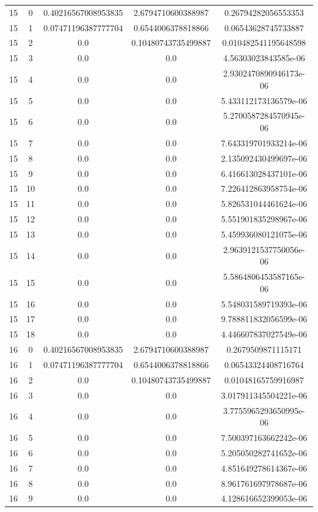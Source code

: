 \documentclass{article}
\begin{document}
\begin{table}[h]
\begin{tabular}{|c|c|c|c|c|}
15 & 0 & 0.40216567008953835 & 2.6794710600388987 & 0.26794282056553353 \\
15 & 1 & 0.07471196387777704 & 0.6544006378818866 & 0.06543628745733887 \\
15 & 2 & 0.0 & 0.10480743735499887 & 0.010482541195648598 \\
15 & 3 & 0.0 & 0.0 & 4.56303023843585e-06 \\
15 & 4 & 0.0 & 0.0 & 2.9302470890946173e-06 \\
15 & 5 & 0.0 & 0.0 & 5.433112173136579e-06 \\
15 & 6 & 0.0 & 0.0 & 5.2700587284570945e-06 \\
15 & 7 & 0.0 & 0.0 & 7.643319701933214e-06 \\
15 & 8 & 0.0 & 0.0 & 2.135092430499697e-06 \\
15 & 9 & 0.0 & 0.0 & 6.416613028437101e-06 \\
15 & 10 & 0.0 & 0.0 & 7.226412863958754e-06 \\
15 & 11 & 0.0 & 0.0 & 5.826531044461624e-06 \\
15 & 12 & 0.0 & 0.0 & 5.551901835298967e-06 \\
15 & 13 & 0.0 & 0.0 & 5.459936080121075e-06 \\
15 & 14 & 0.0 & 0.0 & 2.9639121537750056e-06 \\
15 & 15 & 0.0 & 0.0 & 5.5864806453587165e-06 \\
15 & 16 & 0.0 & 0.0 & 5.548031589719393e-06 \\
15 & 17 & 0.0 & 0.0 & 9.788811832056599e-06 \\
15 & 18 & 0.0 & 0.0 & 4.446607837027549e-06 \\
16 & 0 & 0.40216567008953835 & 2.6794710600388987 & 0.2679509871115171 \\
16 & 1 & 0.07471196387777704 & 0.6544006378818866 & 0.06543324408716764 \\
16 & 2 & 0.0 & 0.10480743735499887 & 0.01048165759916987 \\
16 & 3 & 0.0 & 0.0 & 3.017911345504221e-06 \\
16 & 4 & 0.0 & 0.0 & 3.7755965293650995e-06 \\
16 & 5 & 0.0 & 0.0 & 7.500397163662242e-06 \\
16 & 6 & 0.0 & 0.0 & 5.205050282741652e-06 \\
16 & 7 & 0.0 & 0.0 & 4.851649278614367e-06 \\
16 & 8 & 0.0 & 0.0 & 8.961761697978687e-06 \\
16 & 9 & 0.0 & 0.0 & 4.128616652399053e-06 \\

\end{tabular}
\end{table}
\end{document}
